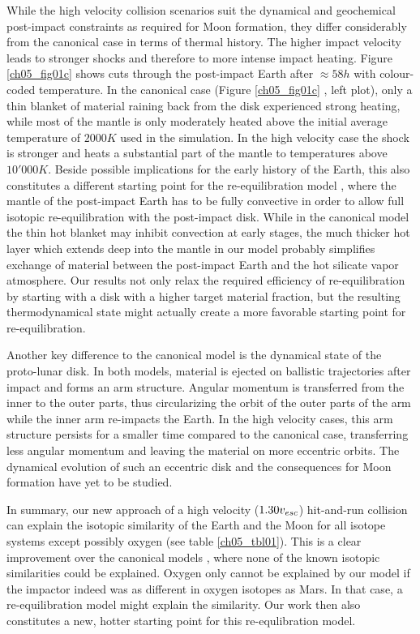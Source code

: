 While the high velocity collision scenarios suit the dynamical and geochemical post-impact constraints as required for Moon formation, they differ considerably from the canonical case in terms of thermal history. The higher impact velocity leads to stronger shocks and therefore to more intense impact heating. Figure \ref{ch05_fig01c} shows cuts through the post-impact Earth after $\approx 58h$ with colour-coded temperature. In the canonical case (Figure \ref{ch05_fig01c} , left plot), only a thin blanket of material raining back from the disk experienced strong heating, while most of the mantle is only moderately heated above the initial average temperature of $2000K$ used in the simulation. In the high velocity case the shock is stronger and heats a substantial part of the mantle to temperatures above $10'000K$. Beside possible implications for the early history of the Earth, this also constitutes a different starting point for the re-equilibration model \citep{Pahlevan:2007p2065}, where the mantle of the post-impact Earth has to be fully convective in order to allow full isotopic re-equilibration with the post-impact disk. While in the canonical model the thin hot blanket may inhibit convection at early stages, the much thicker hot layer which extends deep into the mantle in our model probably simplifies exchange of material between the post-impact Earth and the hot silicate vapor atmosphere. Our results not only relax the required efficiency of re-equilibration by starting with a disk with a higher target material fraction, but the resulting thermodynamical state might actually create a more favorable starting point for re-equilibration.

Another key difference to the canonical model is the dynamical state of the proto-lunar disk. In both models, material is ejected on ballistic trajectories after impact and forms an arm structure. Angular momentum is transferred from the inner to the outer parts, thus circularizing the orbit of the outer parts of the arm while the inner arm re-impacts the Earth. In the high velocity cases, this arm structure persists for a smaller time compared to the canonical case, transferring less angular momentum and leaving the material on more eccentric orbits. The dynamical evolution of such an eccentric disk and the consequences for Moon formation have yet to be studied.

In summary, our new approach of a high velocity ($1.30 v_{esc}$) hit-and-run collision can explain the isotopic similarity of the Earth and the Moon for all isotope systems except possibly oxygen (see table \ref{ch05_tbl01}). This is a clear improvement over the canonical models \citep{Canup:2004p115}, where none of the known isotopic similarities could be explained. Oxygen only cannot be explained by our model if the impactor indeed was as different in oxygen isotopes as Mars. In that case, a re-equilibration model \citep{Pahlevan:2007p2065, 2011E&PSL.301..433P} might explain the similarity. Our work then also constitutes a new, hotter starting point for this re-equlibration model. 

